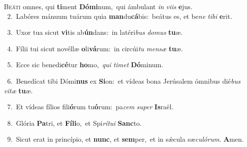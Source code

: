 \lettrine{\initial\textcolor{\initialcolor}{B}}{eáti} omnes, qui \textbf{ti}\-ment \textbf{Dó}\-\textbf{mi}num,~\star qui ámbulant \textit{in} \textit{vi}\-\textit{is} \textbf{e}\-jus.\\
{\numbfont\textcolor{\numbcolor}{~2.}}~Labóres mánuum tuárum quia \textbf{man}\-du\-\textbf{cá}\-bis:~\star beátus es, et be\textit{ne} \textit{ti}\-\textit{bi} \textbf{e}\-rit.\par
{\numbfont\textcolor{\numbcolor}{~3.}}~Uxor tua sicut \textbf{vi}\-tis ab\-\textbf{ún}\-dans:~\star in latéri\textit{bus} \textit{do}\-\textit{mus} \textbf{tu}\-æ.\par
{\numbfont\textcolor{\numbcolor}{~4.}}~Fílii tui sicut novéllæ \textbf{o}\-li\-\textbf{vá}\-rum:~\star in circúi\textit{tu} \textit{men}\-\textit{sæ} \textbf{tu}\-æ.\par
{\numbfont\textcolor{\numbcolor}{~5.}}~Ecce sic benedi\-\textbf{cé}\-tur \textbf{ho}\-mo,~\star \textit{qui} \textit{ti}\-\textit{met} \textbf{Dó}\-minum.\par
{\numbfont\textcolor{\numbcolor}{~6.}}~Benedícat tibi Dómi\textbf{nus} ex \textbf{Si}\-on:~\star et vídeas bona Jerúsalem ómnibus dié\textit{bus} \textit{vi}\-\textit{tæ} \textbf{tu}\-æ.\par
{\numbfont\textcolor{\numbcolor}{~7.}}~Et vídeas fílios fili\-\textbf{ó}\-rum tu\-\textbf{ó}\-rum:~\star pa\textit{cem} \textit{su}\-\textit{per} \textbf{Is}\-raël.\par
{\numbfont\textcolor{\numbcolor}{~8.}}~Glória \textbf{Pa}\-tri, et \textbf{Fí}\-\textbf{li}o,~\star et Spi\-\textit{rí}\-\textit{tu}\textit{i} \textbf{Sanc}\-to.\par
{\numbfont\textcolor{\numbcolor}{~9.}}~Sicut erat in princípio, et \textbf{nunc}\-, et \textbf{sem}\-per,~\star et in sǽcula sæ\-\textit{cu}\-\textit{ló}\textit{rum}. \textbf{A}\-men.\par
